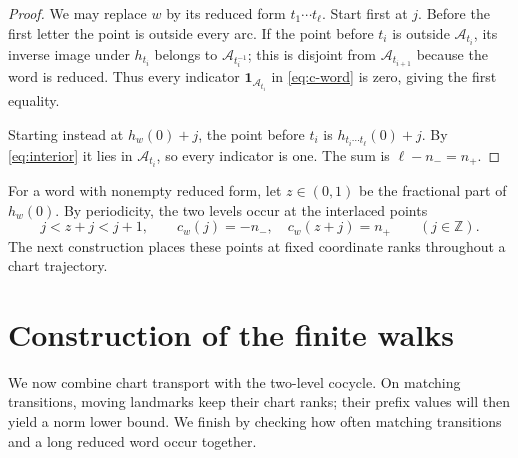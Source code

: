 \documentclass[11pt]{article}
\theoremstyle{definition}
\theoremstyle{remark}
\newcommand{\Z}{\mathbb Z}
\newcommand{\one}{\mathbf 1}
\newcommand{\cA}{\mathcal A}
\begin{document}
\begin{proof}
We may replace $w$ by its reduced form $t_1\cdots t_\ell$.
Start first at $j$. Before the first letter the point is outside every
arc. If the point before $t_i$ is outside $\cA_{t_i}$, its inverse
image under $h_{t_i}$ belongs to $\cA_{t_i^{-1}}$; this is disjoint
from $\cA_{t_{i+1}}$ because the word is reduced.
Thus every indicator $\one_{\cA_{t_i}}$ in \eqref{eq:c-word} is zero,
giving the first equality.

Starting instead at $h_w(0)+j$, the point before $t_i$ is
$h_{t_i\cdots t_\ell}(0)+j$. By \eqref{eq:interior} it lies in
$\cA_{t_i}$, so every indicator is one. The sum is $\ell-n_-=n_+$.
\end{proof}

For a word with nonempty reduced form, let $z\in(0,1)$ be the fractional
part of $h_w(0)$. By periodicity, the two levels occur at the interlaced
points
\[
 j<z+j<j+1,\qquad
 c_w(j)=-n_-,\quad c_w(z+j)=n_+\qquad(j\in\Z).
\]
The next construction places these points at fixed coordinate ranks
throughout a chart trajectory.

\section{Construction of the finite walks}\label{sec:walks}

We now combine chart transport with the two-level cocycle. On matching
transitions, moving landmarks keep their chart ranks; their prefix
values will then yield a norm lower bound. We finish by checking how
often matching transitions and a long reduced word occur together.
\end{document}

